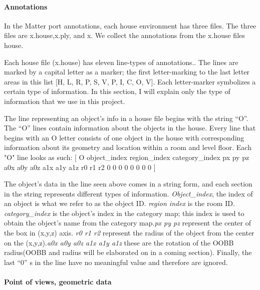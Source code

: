 \paragraph{Annotations}

In the Matter port annotations, each house environment has three files. The three files are x.house,x.ply, and x. We collect the annotations from the x.house files house. 

Each house file (x.house) has eleven line-types of annotations.. The lines are marked by a capital letter as a marker; the first letter-marking to the last letter areas in this list [H, L, R, P, S, V, P, I, C, O, V]. Each letter-marker symbolizes a certain type of information. In this section, I will explain only the type of information that we use in this project.

The line representing an object’s info in a house file begins with the string “O”. The “O” lines contain information about the objects in the house. Every line that begins with an O letter consists of one object in the house with corresponding information about its geometry and location within a room and level floor. Each "O" line looks as such: [ O object\_index region\_index category\_index px py pz  a0x a0y a0z  a1x a1y a1z  r0 r1 r2 0 0 0 0 0 0 0 0 ] 

The object's data in the line seen above comes in a string form, and each section in the string represents different types of information. \textit{Object\_index}, the index of an object is what we refer to as the object ID. \textit{region index} is the room ID. \textit{category\_index} is the object’s index in the category map; this index is used to obtain the object’s name from the category map.\textit{px py pz} represent the center of the box in (x,y,z) axis. \textit{r0 r1 r2} represent the radius of the object from the center on the (x,y,z).\textit{a0x a0y a0z  a1x a1y a1z} these are the rotation of the OOBB radius(OOBB and radius will be elaborated on in a coming section). Finally, the last “0” s in the line have no meaningful value and therefore are ignored. 

\paragraph{Point of views,  geometric data}

